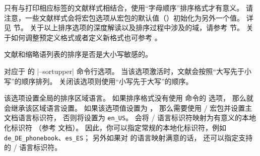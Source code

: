 \begin{optionlist}
只有与打印相应标签的文献样式相结合，使用“字母顺序”排序格式才有意义。
请注意，一些文献样式会将宏包选项从宏包的默认值（）初始化为另外一个值。
详见  节。
关于以上排序选项的深度解读以及排序过程中涉及的域，请参考  节。
关于如何调整预定义格式或者定义新格式也可参考 。



文献和缩略语列表的排序是否是大小写敏感的。



对应于 \biber 的 |--sortupper| 命令行选项。
当该选项激活时，文献会按照“大写先于小写”的顺序排列。
关闭该选项则使用“小写先于大写”的顺序。



该选项设置全局的排序区域语言。
如果排序格式没有使用  命令的  选项，
那么就会继承该区域语言设置。
如果该选项值设置为 ，
那么需要使用 / 宏包并设置主文档语言标识符，
否则将设置为 \texttt{en\_US}。
\biber 会将 / 语言标识符映射为有意义的本地化标识符
（参考 \biber 文档）。
因此，你可以指定常规的本地化标识符，例如 \texttt{de\_DE\_phonebook}、\texttt{es\_ES}；
另外如果对 \biber 的语言映射满意的话，
还可以指定支持的 / 语言标识符。



\end{optionlist}
